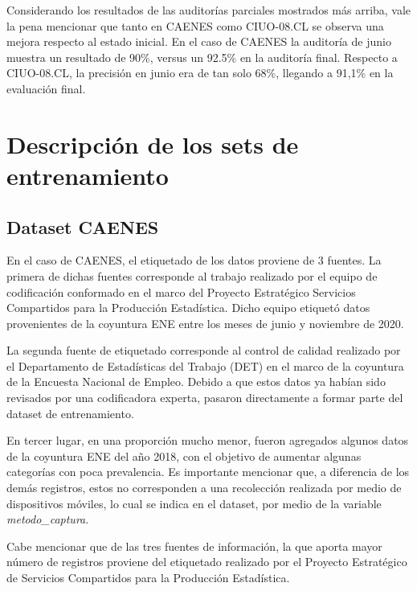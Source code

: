 \documentclass[
  12pt,
  spanish,
]{article}
\begin{document}
Considerando los resultados de las auditorías parciales mostrados más
arriba, vale la pena mencionar que tanto en CAENES como CIUO-08.CL se
observa una mejora respecto al estado inicial. En el caso de CAENES la
auditoría de junio muestra un resultado de 90\%, versus un 92.5\% en la
auditoría final. Respecto a CIUO-08.CL, la precisión en junio era de tan
solo 68\%, llegando a 91,1\% en la evaluación final.

\newpage

\hypertarget{descripciuxf3n-de-los-sets-de-entrenamiento}{%
\section{Descripción de los sets de
entrenamiento}\label{descripciuxf3n-de-los-sets-de-entrenamiento}}

\hypertarget{dataset-caenes}{%
\subsection{Dataset CAENES}\label{dataset-caenes}}

En el caso de CAENES, el etiquetado de los datos proviene de 3 fuentes.
La primera de dichas fuentes corresponde al trabajo realizado por el
equipo de codificación conformado en el marco del Proyecto Estratégico
Servicios Compartidos para la Producción Estadística. Dicho equipo
etiquetó datos provenientes de la coyuntura ENE entre los meses de junio
y noviembre de 2020.

La segunda fuente de etiquetado corresponde al control de calidad
realizado por el Departamento de Estadísticas del Trabajo (DET) en el
marco de la coyuntura de la Encuesta Nacional de Empleo. Debido a que
estos datos ya habían sido revisados por una codificadora experta,
pasaron directamente a formar parte del dataset de entrenamiento.

En tercer lugar, en una proporción mucho menor, fueron agregados algunos
datos de la coyuntura ENE del año 2018, con el objetivo de aumentar
algunas categorías con poca prevalencia. Es importante mencionar que, a
diferencia de los demás registros, estos no corresponden a una
recolección realizada por medio de dispositivos móviles, lo cual se
indica en el dataset, por medio de la variable \emph{metodo\_captura}.

Cabe mencionar que de las tres fuentes de información, la que aporta
mayor número de registros proviene del etiquetado realizado por el
Proyecto Estratégico de Servicios Compartidos para la Producción
Estadística.
\end{document}
